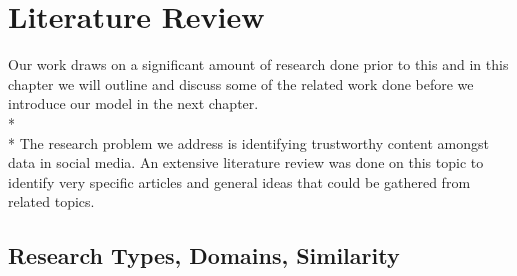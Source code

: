 \chapter{Literature Review}
Our work draws on a significant amount of research done prior to this and in this chapter we will outline and discuss some of the related work done before we introduce our model in the next chapter. 
\\*\\*
The research problem we address is identifying trustworthy content amongst data in social media. An extensive literature review was done on this topic to identify very specific articles and general ideas that could be gathered from related topics. 
\section{Research Types, Domains, Similarity}
